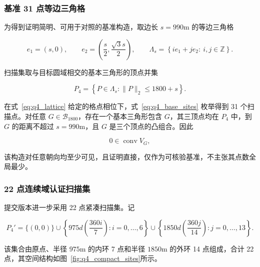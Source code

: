 \subsubsection{基准 31 点等边三角格}

为得到证明简明、可用于对照的基准构造，取边长 $s=990\mathrm{m}$ 的等边三角格

\begin{equation}
e_1=(s,0),\qquad
e_2=\left(\frac{s}{2},\frac{\sqrt{3}s}{2}\right),
\qquad
\Lambda_s=
\left\{
ie_1+je_2:\ i,j\in\mathbb Z
\right\}.
\label{eq:q4_lattice}
\end{equation}

扫描集取与目标圆域相交的基本三角形的顶点并集

\begin{equation}
P_4=
\left\{
P\in\Lambda_s:
\lVert P\rVert_2\le1800+s
\right\}.
\label{eq:q4_base_sites}
\end{equation}

在式~\eqref{eq:q4_lattice} 给定的格点相位下，式~\eqref{eq:q4_base_sites} 枚举得到 31 个扫描点。对任意 $G\in\mathcal B_{1800}$，存在一个基本三角形包含 $G$，其三顶点均在 $P_4$ 中，到 $G$ 的距离不超过 $s=990\mathrm{m}$，且 $G$ 是三个顶点的凸组合。因此

\begin{equation}
0\in\operatorname{conv}V_G,
\label{eq:q4_lattice_certificate}
\end{equation}

该构造对任意朝向均至少可见，且证明直接，仅作为可核验基准，不主张其点数全局最少。

\subsubsection{22 点连续域认证扫描集}

提交版本进一步采用 22 点紧凑扫描集。记

\begin{equation}
P_4'=
\{(0,0)\}
\cup
\left\{
975d\left(\frac{360i}{7}\right):
i=0,\ldots,6
\right\}
\cup
\left\{
1850d\left(\frac{360j}{14}\right):
j=0,\ldots,13
\right\}.
\label{eq:q4_compact_sites}
\end{equation}

该集合由原点、半径 $975\mathrm{m}$ 的内环 7 点和半径 $1850\mathrm{m}$ 的外环 14 点组成，合计 22 点，其空间结构如图~\ref{fig:q4_compact_sites}所示。

